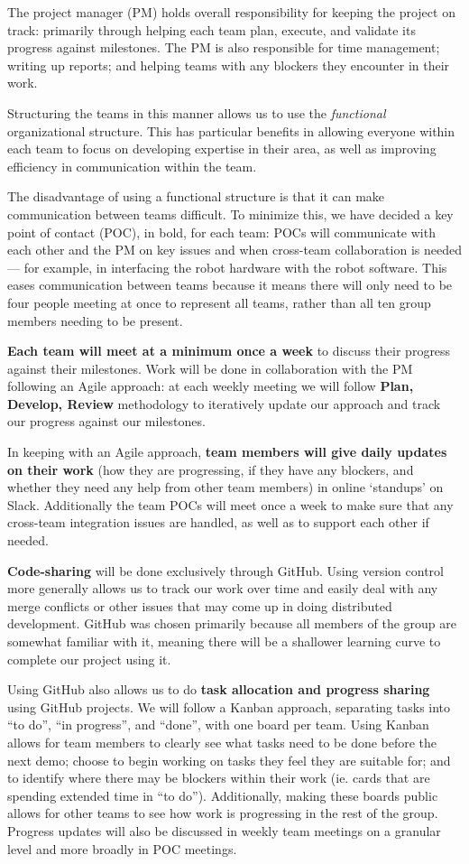 \documentclass{article}
\begin{document}
The project manager (PM) holds overall responsibility for keeping the project on track: primarily through helping each team plan, execute, and validate its progress against milestones. The PM is also responsible for time management; writing up reports; and helping teams with any blockers they encounter in their work.

Structuring the teams in this manner allows us to use the {\it functional} organizational structure. This has particular benefits in allowing everyone within each team to focus on developing expertise in their area, as well as improving efficiency in communication within the team.

The disadvantage of using a functional structure is that it can make communication between teams difficult. To minimize this, we have decided a key point of contact (POC), in bold, for each team: POCs will communicate with each other and the PM on key issues and when cross-team collaboration is needed --- for example, in interfacing the robot hardware with the robot software. This eases communication between teams because it means there will only need to be four people meeting at once to represent all teams, rather than all ten group members needing to be present.

{\bf Each team will meet at a minimum once a week} to discuss their progress against their milestones. Work will be done in collaboration with the PM following an Agile approach: at each weekly meeting we will follow {\bf Plan, Develop, Review} methodology to iteratively update our approach and track our progress against our milestones.

In keeping with an Agile approach, {\bf team members will give daily updates on their work} (how they are progressing, if they have any blockers, and whether they need any help from other team members) in online `standups' on Slack. Additionally the team POCs will meet once a week to make sure that any cross-team integration issues are handled, as well as to support each other if needed. 

{\bf Code-sharing} will be done exclusively through GitHub. Using version control more generally allows us to track our work over time and easily deal with any merge conflicts or other issues that may come up in doing distributed development. GitHub was chosen primarily because all members of the group are somewhat familiar with it, meaning there will be a shallower learning curve to complete our project using it. 

Using GitHub also allows us to do {\bf task allocation and progress sharing} using GitHub projects. We will follow a Kanban approach, separating tasks into ``to do'', ``in progress'', and ``done'', with one board per team. Using Kanban allows for team members to clearly see what tasks need to be done before the next demo; choose to begin working on tasks they feel they are suitable for; and to identify where there may be blockers within their work (ie. cards that are spending extended time in ``to do''). Additionally, making these boards public allows for other teams to see how work is progressing in the rest of the group. Progress updates will also be discussed in weekly team meetings on a granular level and more broadly in POC meetings.
\end{document}
